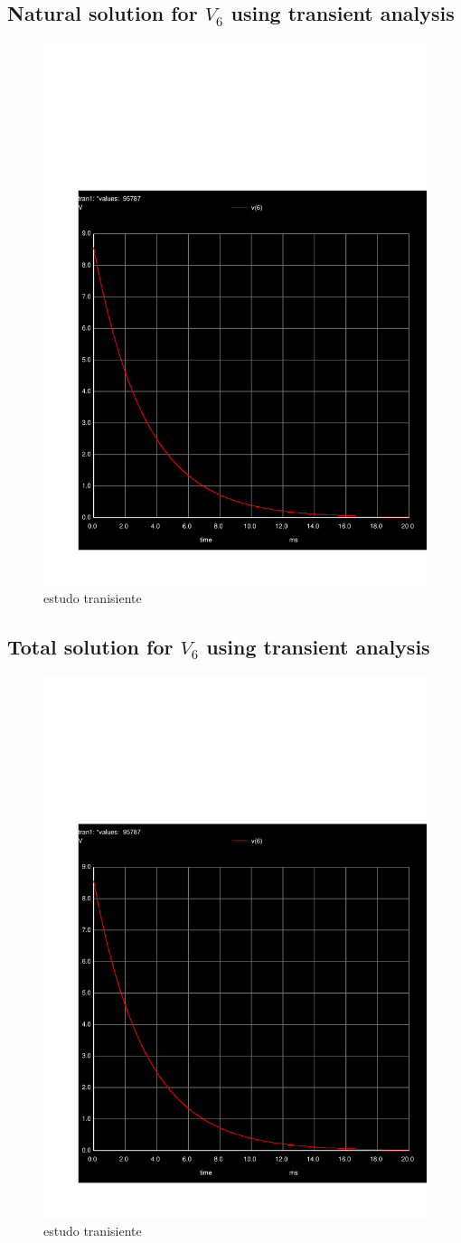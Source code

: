 \pagebreak
\subsection{ Natural solution for $V_6$ using transient analysis}
\begin{figure}[h] \centering
\includegraphics[width=0.6\linewidth]{trans.pdf}
\caption{estudo tranisiente}
\label{fig:transient}
\end{figure}

\pagebreak
\subsection{ Total solution for $V_6$ using transient analysis}

\begin{figure}[h] \centering
\includegraphics[width=0.6\linewidth]{trans.pdf}
\caption{estudo tranisiente}
\label{fig:transient}
\end{figure}

